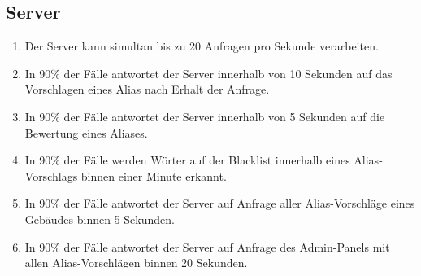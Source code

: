 \subsection{Server}

\begin{enumerate}
    \item Der Server kann simultan bis zu 20 Anfragen pro Sekunde verarbeiten.
    \item In 90\% der Fälle antwortet der Server innerhalb von 10 Sekunden auf das Vorschlagen eines Alias nach Erhalt der Anfrage.
    \item In 90\% der Fälle antwortet der Server innerhalb von 5 Sekunden auf die Bewertung eines Aliases.
    \item In 90\% der Fälle werden Wörter auf der Blacklist innerhalb eines Alias-Vorschlags binnen einer Minute erkannt.
    \item In 90\% der Fälle antwortet der Server auf Anfrage aller Alias-Vorschläge eines Gebäudes binnen 5 Sekunden.
    \item In 90\% der Fälle antwortet der Server auf Anfrage des Admin-Panels mit allen Alias-Vorschlägen binnen 20 Sekunden.
\end{enumerate}